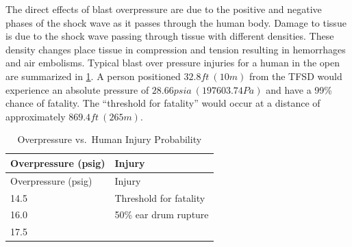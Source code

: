 \documentclass[10pt,parskip=half,
toc=sectionentrywithdots,
bibliography=totocnumbered,
captions=tableheading,numbers=noendperiod]{scrartcl}
\begin{document}
The direct effects of blast overpressure are due to the positive and
negative phases of the shock wave as it passes through the human body.
Damage to tissue is due to the shock wave passing through tissue with
different densities. These density changes place tissue in compression
and tension resulting in hemorrhages and air embolisms. Typical blast
over pressure injuries for a human in the open are summarized in
\cref{tbl:tbl_nfpa}. A person positioned \(32.8ft\:(10m)\) from the TFSD
would experience an absolute pressure of \(28.66psia\:(197603.74Pa)\)
and have a 99\% chance of fatality. The ``threshold for fatality'' would
occur at a distance of approximately \(869.4ft\:(265m)\). \newpage

\begin{longtable}[]{@{}ll@{}}
\caption{Overpressure vs.~Human Injury Probability\cite{nfpa_921_2014}
\label{tbl:tbl_nfpa}}\tabularnewline
\toprule
\begin{minipage}[b]{0.24\columnwidth}\raggedright
Overpressure (psig)\strut
\end{minipage} & \begin{minipage}[b]{0.38\columnwidth}\raggedright
Injury\strut
\end{minipage}\tabularnewline
\midrule
\endfirsthead
\toprule
\begin{minipage}[b]{0.24\columnwidth}\raggedright
Overpressure (psig)\strut
\end{minipage} & \begin{minipage}[b]{0.38\columnwidth}\raggedright
Injury\strut
\end{minipage}\tabularnewline
\midrule
\endhead
\begin{minipage}[t]{0.24\columnwidth}\raggedright
14.5\strut
\end{minipage} & \begin{minipage}[t]{0.38\columnwidth}\raggedright
Threshold for fatality\strut
\end{minipage}\tabularnewline
\begin{minipage}[t]{0.24\columnwidth}\raggedright
16.0\strut
\end{minipage} & \begin{minipage}[t]{0.38\columnwidth}\raggedright
50\% ear drum rupture\strut
\end{minipage}\tabularnewline
\begin{minipage}[t]{0.24\columnwidth}\raggedright
17.5\strut
\end{minipage} & \begin{minipage}[t]{0.38\columnwidth}\raggedright

\end{minipage}
\end{longtable}
\end{document}
